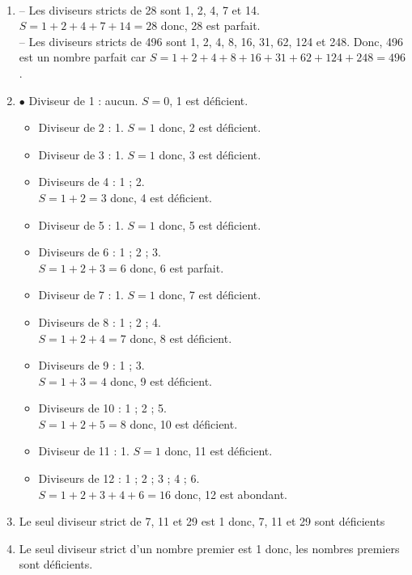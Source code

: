 \begin{corrige}
   \ \\ [-5mm]
   \begin{enumerate}
      \item -- Les diviseurs stricts de 28 sont 1, 2, 4, 7 et 14. \\
         $S =1+2+4+7+14 =28$ donc, {\color{red} 28 est parfait}. \\
         -- Les diviseurs stricts de 496 sont 1, 2, 4, 8, 16, 31, 62, 124 et 248. Donc, {\color{red} 496 est un nombre parfait} car
         $S =1+2+4+8+16+31+62+124+248 =496$.
      \item \textcolor{G1}{$\bullet$} Diviseur de 1 : aucun. $S =0$, {\color{red} 1 est déficient}.
      \begin{itemize}
         \item Diviseur de 2 : 1. $S =1$ donc, 2 est déficient.
         \item Diviseur de 3 : 1. $S =1$ donc, 3 est déficient.
         \item Diviseurs de 4 : 1 ; 2. \\
            $S =1+2 =3$ donc, 4 est déficient.
         \item Diviseur de 5 : 1. $S =1$ donc, 5 est déficient.
         \item Diviseurs de 6 : 1 ; 2 ; 3. \\
            $S =1+2+3 =6$ donc, {\color{red} 6 est parfait}.
         \item Diviseur de 7 : 1. $S =1$ donc, 7 est déficient.
         \item Diviseurs de 8 : 1 ; 2 ; 4. \\
            $S =1+2+4 =7$ donc, 8 est déficient.
         \item Diviseurs de 9 : 1 ; 3. \\
            $S =1+3 =4$ donc, 9 est déficient.
         \item Diviseurs de 10 : 1 ; 2 ; 5. \\
            $S =1+2+5 =8$ donc, 10 est déficient.
         \item Diviseur de 11 : 1. $S =1$ donc, 11 est déficient.
         \item Diviseurs de 12 : 1 ; 2 ; 3 ; 4 ; 6. \\
            $S =1+2+3+4+6 =16$ donc, {\color{red} 12 est abondant}.
      \end{itemize}
      \item Le seul diviseur strict de 7, 11 et 29 est 1 donc, {\color{red} 7, 11 et 29 sont déficients}
      \item Le seul diviseur strict d'un nombre premier est 1 donc, {\color{red} les nombres premiers sont déficients}.
   \end{enumerate}
\end{corrige}
